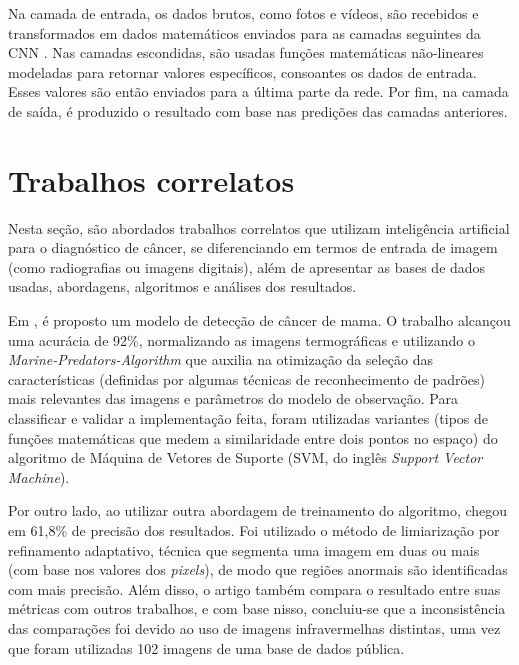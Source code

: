 Na camada de entrada, os dados brutos, como fotos e vídeos, são recebidos e transformados em dados matemáticos enviados para as camadas seguintes da CNN \cite{cnn}. Nas camadas escondidas, são usadas funções matemáticas não-lineares modeladas para retornar valores específicos, consoantes os dados de entrada. Esses valores são então enviados para a última parte da rede. Por fim, na camada de saída, é produzido o resultado com base nas predições das camadas anteriores.







\section{\esp Trabalhos correlatos} \label{trabcorr}

Nesta seção, são abordados trabalhos correlatos que utilizam inteligência artificial para o diagnóstico de câncer, se diferenciando em termos de entrada de imagem (como radiografias ou imagens digitais), além de apresentar as bases de dados usadas, abordagens, algoritmos e análises dos resultados. 

Em , é proposto um modelo de detecção de câncer de mama. O trabalho alcançou uma acurácia de 92\%, normalizando as imagens termográficas e utilizando o \textit{Marine-Predators-Algorithm} que auxilia na otimização da seleção das características (definidas por algumas técnicas de reconhecimento de padrões) mais relevantes das imagens e parâmetros do modelo de observação. Para classificar e validar a implementação feita, foram utilizadas variantes (tipos de funções matemáticas que medem a similaridade entre dois pontos no espaço) do algoritmo de Máquina de Vetores de Suporte (SVM, do inglês \textit{Support Vector Machine}).

Por outro lado,  ao utilizar outra abordagem de treinamento do algoritmo, chegou em 61,8\% de precisão dos resultados. Foi utilizado o método de limiarização por refinamento adaptativo, técnica que segmenta uma imagem em duas ou mais (com base nos valores dos \textit{pixels}), de modo que regiões anormais são identificadas com mais precisão. Além disso, o artigo também compara o resultado entre suas métricas com outros trabalhos, e com base nisso, concluiu-se que a inconsistência das comparações foi devido ao uso de imagens infravermelhas distintas, uma vez que foram utilizadas 102 imagens de uma base de dados pública.

